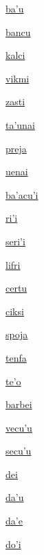 {\hyperlink{val:bahu}{ba'u}}{}{}{}

{\hyperlink{val:bancu}{bancu}}{}{}{}

{\hyperlink{val:kalci}{kalci}}{}{}{}

{\hyperlink{val:vikmi}{vikmi}}{}{}{}

{\hyperlink{val:zasti}{zasti}}{}{}{}

{\hyperlink{val:tahunai}{ta'unai}}{}{}{}

{\hyperlink{val:preja}{preja}}{}{}{}

{\hyperlink{val:uenai}{uenai}}{}{}{}

{\hyperlink{val:bahacuhi}{ba'acu'i}}{}{}{}

{\hyperlink{val:rihi}{ri'i}}{}{}{}

{\hyperlink{val:serihi}{seri'i}}{}{}{}

{\hyperlink{val:lifri}{lifri}}{}{}{}

{\hyperlink{val:certu}{certu}}{}{}{}

{\hyperlink{val:ciksi}{ciksi}}{}{}{}

{\hyperlink{val:spoja}{spoja}}{}{}{}

{\hyperlink{val:tenfa}{tenfa}}{}{}{}

{\hyperlink{val:teho}{te'o}}{}{}{}

{\hyperlink{val:barbei}{barbei}}{}{}{}

{\hyperlink{val:vecuhu}{vecu'u}}{}{}{}

{\hyperlink{val:secuhu}{secu'u}}{}{}{}

{\hyperlink{val:dei}{dei}}{}{}{}

{\hyperlink{val:dahu}{da'u}}{}{}{}

{\hyperlink{val:dahe}{da'e}}{}{}{}

{\hyperlink{val:dohi}{do'i}}{}{}{}

